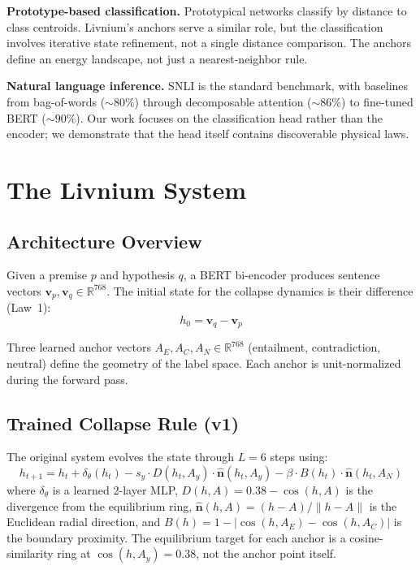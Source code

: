 \documentclass[11pt]{article}
\newcommand{\anchor}[1]{A_{#1}}
\newcommand{\nhat}{\hat{\bm{n}}}
\newcommand{\R}{\mathbb{R}}
\begin{document}
\textbf{Prototype-based classification.}
Prototypical networks \citep{snell2017prototypical} classify by distance
to class centroids. Livnium's anchors serve a similar role, but the
classification involves iterative state refinement, not a single distance
comparison. The anchors define an energy landscape, not just a nearest-neighbor rule.

\textbf{Natural language inference.}
SNLI \citep{bowman2015snli} is the standard benchmark, with baselines
from bag-of-words (${\sim}80\%$) through decomposable attention
\citep{parikh2016decomposable} (${\sim}86\%$) to fine-tuned BERT
\citep{devlin2019bert} (${\sim}90\%$). Our work focuses on the
classification head rather than the encoder; we demonstrate that the
head itself contains discoverable physical laws.

\section{The Livnium System}
\label{sec:system}

\subsection{Architecture Overview}

Given a premise $p$ and hypothesis $q$, a BERT bi-encoder produces
sentence vectors $\bm{v}_p, \bm{v}_q \in \R^{768}$. The initial state
for the collapse dynamics is their difference (Law~1):
\[
    h_0 = \bm{v}_q - \bm{v}_p
\]

Three learned anchor vectors $\anchor{E}, \anchor{C}, \anchor{N} \in \R^{768}$
(entailment, contradiction, neutral) define the geometry of the label
space. Each anchor is unit-normalized during the forward pass.

\subsection{Trained Collapse Rule (v1)}

The original system evolves the state through $L=6$ steps using:
\begin{equation}
\label{eq:trained_update}
    h_{t+1} = h_t
    + \delta_\theta(h_t)
    - s_y \cdot D(h_t, \anchor{y}) \cdot \nhat(h_t, \anchor{y})
    - \beta \cdot B(h_t) \cdot \nhat(h_t, \anchor{N})
\end{equation}
where $\delta_\theta$ is a learned 2-layer MLP, $D(h, A) = 0.38 - \cos(h, A)$
is the divergence from the equilibrium ring, $\nhat(h, A) = (h-A)/\|h-A\|$
is the Euclidean radial direction, and $B(h) = 1 - |\cos(h, \anchor{E}) - \cos(h, \anchor{C})|$
is the boundary proximity. The equilibrium target for each anchor is a
cosine-similarity ring at $\cos(h, A_y) = 0.38$, not the anchor point
itself.
\end{document}
